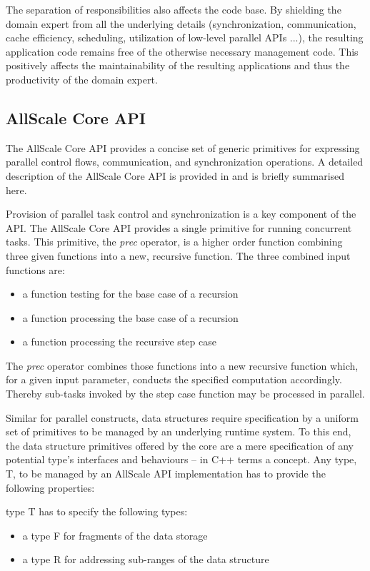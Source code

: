 \documentclass[conference,compsoc]{IEEEtran}
\begin{document}
The separation of responsibilities also affects the code base. By shielding the
domain expert from all the underlying details (synchronization, communication,
cache efficiency, scheduling, utilization of low-level parallel APIs ...), the
resulting application code remains free of the otherwise necessary management
code. This positively affects the maintainability of the resulting applications and
thus the productivity of the domain expert.

\subsection{AllScale Core API}
The AllScale Core API provides a concise set of generic primitives for expressing
parallel control flows, communication, and synchronization operations. A detailed description of the AllScale Core API is provided in \cite{allscale_architecure_2017} and is briefly summarised here.

Provision of parallel task control and synchronization is a key component of the API.
The AllScale Core API provides a single primitive for running concurrent tasks.
This primitive, the \textit{prec} operator, is a higher order function combining three
given functions into a new, recursive function. The three combined input
functions are:
\begin{itemize}
\item a function testing for the base case of a recursion
\item a function processing the base case of a recursion
\item a function processing the recursive step case
\end{itemize}
The \textit{prec} operator combines those functions into a new recursive function which,
for a given input parameter, conducts the specified computation accordingly.
Thereby sub-tasks invoked by the step case function may be processed in
parallel.


Similar for parallel constructs, data structures require specification by a uniform set of primitives to be managed by an underlying runtime system. 
To this end, the data structure primitives offered by the core are a mere
specification of any potential type's interfaces and behaviours -- in C++ terms a
concept. Any type, T, to be managed by an AllScale API implementation has to
provide the following properties:

type T has to specify the following types:
\begin{itemize}
\item a type F for fragments of the data storage
\item a type R for addressing sub-ranges of the data structure
 \end{itemize}
\end{document}
